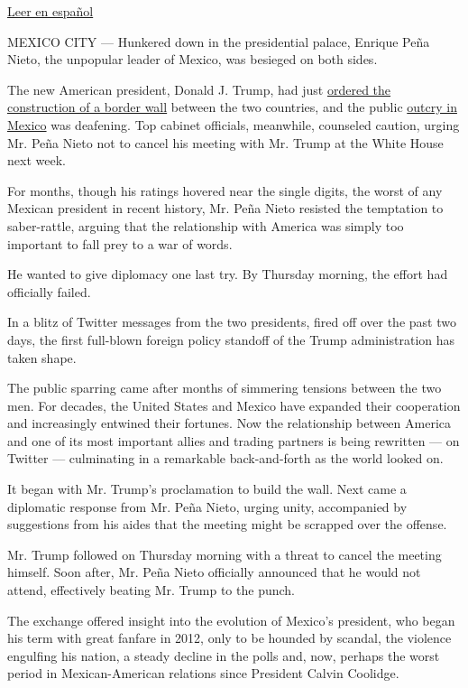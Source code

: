 \href{https://www.nytimes.com/es/2017/01/27/arrinconado-enrique-pena-nieto-responde-al-golpe-de-donald-trump/}{Leer
en español}

MEXICO CITY --- Hunkered down in the presidential palace, Enrique Peña
Nieto, the unpopular leader of Mexico, was besieged on both sides.

The new American president, Donald J. Trump, had just
\href{https://www.nytimes.com/2017/01/25/us/politics/refugees-immigrants-wall-trump.html}{ordered
the construction of a border wall} between the two countries, and the
public
\href{https://www.nytimes.com/2017/01/25/world/americas/trump-mexico-border-wall.html}{outcry
in Mexico} was deafening. Top cabinet officials, meanwhile, counseled
caution, urging Mr. Peña Nieto not to cancel his meeting with Mr. Trump
at the White House next week.

For months, though his ratings hovered near the single digits, the worst
of any Mexican president in recent history, Mr. Peña Nieto resisted the
temptation to saber-rattle, arguing that the relationship with America
was simply too important to fall prey to a war of words.

He wanted to give diplomacy one last try. By Thursday morning, the
effort had officially failed.

In a blitz of Twitter messages from the two presidents, fired off over
the past two days, the first full-blown foreign policy standoff of the
Trump administration has taken shape.

The public sparring came after months of simmering tensions between the
two men. For decades, the United States and Mexico have expanded their
cooperation and increasingly entwined their fortunes. Now the
relationship between America and one of its most important allies and
trading partners is being rewritten --- on Twitter --- culminating in a
remarkable back-and-forth as the world looked on.

It began with Mr. Trump's proclamation to build the wall. Next came a
diplomatic response from Mr. Peña Nieto, urging unity, accompanied by
suggestions from his aides that the meeting might be scrapped over the
offense.

Mr. Trump followed on Thursday morning with a threat to cancel the
meeting himself. Soon after, Mr. Peña Nieto officially announced that he
would not attend, effectively beating Mr. Trump to the punch.

The exchange offered insight into the evolution of Mexico's president,
who began his term with great fanfare in 2012, only to be hounded by
scandal, the violence engulfing his nation, a steady decline in the
polls and, now, perhaps the worst period in Mexican-American relations
since President Calvin Coolidge.

